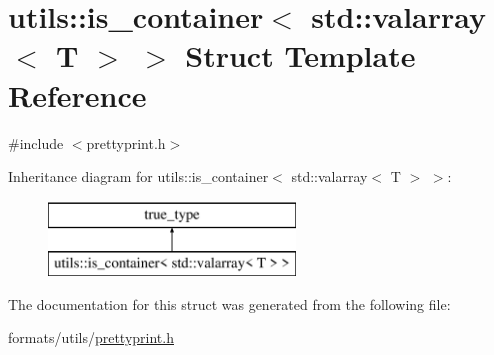 \hypertarget{structutils_1_1is__container_3_01std_1_1valarray_3_01_t_01_4_01_4}{}\section{utils\+::is\+\_\+container$<$ std\+::valarray$<$ T $>$ $>$ Struct Template Reference}
\label{structutils_1_1is__container_3_01std_1_1valarray_3_01_t_01_4_01_4}


{\ttfamily \#include $<$prettyprint.\+h$>$}

Inheritance diagram for utils\+::is\+\_\+container$<$ std\+::valarray$<$ T $>$ $>$\+:\begin{figure}[H]
\begin{center}
\leavevmode
\includegraphics[height=2.000000cm]{d8/dd8/structutils_1_1is__container_3_01std_1_1valarray_3_01_t_01_4_01_4}
\end{center}
\end{figure}


The documentation for this struct was generated from the following file\+:\begin{DoxyCompactItemize}
\item 
formats/utils/\mbox{\hyperlink{prettyprint_8h}{prettyprint.\+h}}\end{DoxyCompactItemize}
